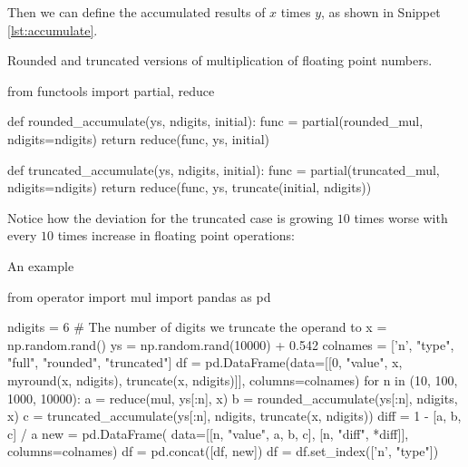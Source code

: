 Then we can define the accumulated results of $x$ times $y$, as shown in Snippet
\ref{lst:accumulate}.

\begin{algorithm}
    \caption{Rounded and truncated versions of multiplication of floating point numbers.}
    \label{lst:accumulate}
    \begin{pythoncode}
        from functools import partial, reduce


        def rounded_accumulate(ys, ndigits, initial):
            func = partial(rounded_mul, ndigits=ndigits)
            return reduce(func, ys, initial)
        
        
        def truncated_accumulate(ys, ndigits, initial):
            func = partial(truncated_mul, ndigits=ndigits)
            return reduce(func, ys, truncate(initial, ndigits))
    \end{pythoncode}
\end{algorithm}

Notice how the deviation for the truncated case is growing $10$ times worse with every $10$
times increase in floating point operations:

\begin{algorithm}
    \caption{An example}
    \label{lst:compare}
    \begin{pythoncode}
        from operator import mul
        import pandas as pd
        
        ndigits = 6  # The number of digits we truncate the operand to
        x = np.random.rand()
        ys = np.random.rand(10000) + 0.542
        colnames = ['n', "type", "full", "rounded", "truncated"]
        df = pd.DataFrame(data=[[0, "value", x, myround(x, ndigits), truncate(x, ndigits)]],
                          columns=colnames)
        for n in (10, 100, 1000, 10000):
            a = reduce(mul, ys[:n], x)
            b = rounded_accumulate(ys[:n], ndigits, x)
            c = truncated_accumulate(ys[:n], ndigits, truncate(x, ndigits))
            diff = 1 - [a, b, c] / a
            new = pd.DataFrame(
                data=[[n, "value", a, b, c], [n, "diff", *diff]], columns=colnames)
            df = pd.concat([df, new])
        df = df.set_index(['n', "type"])
    \end{pythoncode}
\end{algorithm}

